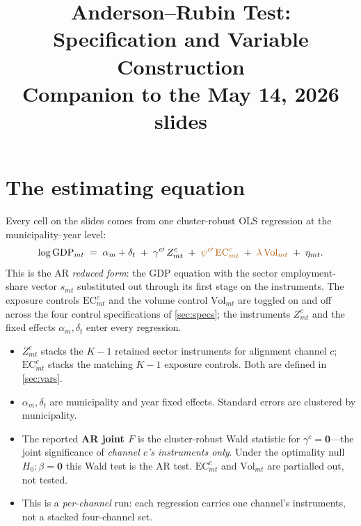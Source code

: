 \documentclass{article}
\newcommand{\tog}[1]{\textcolor{toggle}{#1}}
\newcommand{\EC}{\mathrm{EC}}
\newcommand{\Vol}{\mathrm{Vol}}
\newcommand{\bzero}{\mathbf{0}}
\begin{document}
\title{Anderson--Rubin Test: Specification and Variable Construction\\[2pt]
       \large Companion to the May 14, 2026 slides}
\author{}
\date{}
\maketitle

\noindent

\setlength{\parskip}{6pt}
\setlength{\parindent}{12pt}

\section{The estimating equation}\label{sec:eq}

Every cell on the slides comes from one cluster-robust OLS regression at the
municipality--year level:
\begin{equation}\label{eq:rf}
  \log\mathrm{GDP}_{mt}
  \;=\;
  \alpha_m + \delta_t
  \;+\; \gamma^{c\prime}\,Z^{c}_{mt}
  \;+\; \tog{\psi^{c\prime}\,\EC^{c}_{mt}}
  \;+\; \tog{\lambda\,\Vol_{mt}}
  \;+\; \eta_{mt}.
\end{equation}
This is the AR \emph{reduced form}: the GDP equation with the sector
employment-share vector $s_{mt}$ substituted out through its first stage on the
instruments. The exposure controls
$\EC^{c}_{mt}$ and the volume control $\Vol_{mt}$ are toggled on and off
across the four control specifications of \autoref{sec:specs}; the instruments
$Z^{c}_{mt}$ and the fixed effects $\alpha_m, \delta_t$ enter every regression.

\begin{itemize}[leftmargin=*,nosep]
\item $Z^{c}_{mt}$ stacks the $K-1$ retained sector instruments for alignment channel
  $c$; $\EC^{c}_{mt}$ stacks the matching $K-1$ exposure controls. Both are
  defined in \autoref{sec:vars}.
\item $\alpha_m,\delta_t$ are municipality and year fixed effects. Standard
  errors are clustered by municipality.
\item The reported \textbf{AR joint $F$} is the cluster-robust Wald statistic
  for $\gamma^{c}=\bzero$---the joint significance of \emph{channel $c$'s
  instruments only}. Under the optimality null $H_0:\beta=\bzero$ this Wald
  test is the AR test.
  $\EC^{c}_{mt}$ and $\Vol_{mt}$ are partialled out, not tested.
\item This is a \emph{per-channel} run: each regression carries one channel's
  instruments, not a stacked four-channel set.
\end{itemize}
\end{document}
